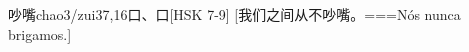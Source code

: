 \begin{EntryWithPhonetic}{吵嘴}{chao3/zui3}{7,16}{⼝、⼝}[HSK 7-9]
  [我们之间从不吵嘴。===Nós nunca brigamos.]
\end{EntryWithPhonetic}
